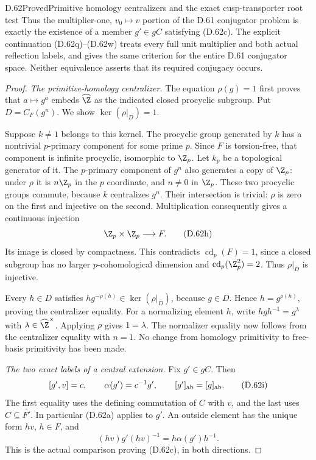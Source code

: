 \begin{claim}{D.62}{Proved}{Primitive homology centralizers and the exact cusp-transporter root test}
Thus the multiplier-one, $v_0\mapsto v$ portion of the
D.61 conjugator problem is exactly the existence of
a member $g'\in gC$ satisfying (D.62c).
The explicit continuation (D.62q)--(D.62w) treats every
full unit multiplier and both actual reflection labels,
and gives the same criterion for the entire D.61
conjugator space. Neither equivalence asserts that
its required conjugacy occurs.
\end{claim}

\begin{proof}
\emph{The primitive-homology centralizer.}
The equation $\rho(g)=1$ first proves that
$a\mapsto g^a$ embeds $\widehat\Z$ as the indicated
closed procyclic subgroup. Put $D=C_F(g^n)$.
We show $\ker(\rho|_D)=1$.

Suppose $k\ne1$ belongs to this kernel.
The procyclic group generated by $k$ has a nontrivial
$p$-primary component for some prime $p$.
Since $F$ is torsion-free, that component is infinite
procyclic, isomorphic to $\Z_p$.
Let $k_p$ be a topological generator of it.
The $p$-primary component of $g^n$ also generates
a copy of $\Z_p$: under $\rho$ it is $n\Z_p$
in the $p$ coordinate, and $n\ne0$ in $\Z_p$.
These two procyclic groups commute, because $k$
centralizes $g^n$. Their intersection is trivial:
$\rho$ is zero on the first and injective on the
second. Multiplication consequently gives a continuous
injection
\[
                 \Z_p\times\Z_p\longrightarrow F.
                                                        \tag{D.62h}
\]
Its image is closed by compactness. This contradicts
$\operatorname{cd}_p(F)=1$, since a closed subgroup
has no larger $p$-cohomological dimension and
$\operatorname{cd}_p(\Z_p^2)=2$.
Thus $\rho|_D$ is injective.

Every $h\in D$ satisfies
$h g^{-\rho(h)}\in\ker(\rho|_D)$, because $g\in D$.
Hence $h=g^{\rho(h)}$, proving the centralizer equality.
For a normalizing element $h$, write
$hgh^{-1}=g^\lambda$ with
$\lambda\in\widehat\Z^\times$.
Applying $\rho$ gives $1=\lambda$.
The normalizer equality now follows from the
centralizer equality with $n=1$.
No change from homology primitivity to free-basis
primitivity has been made.

\emph{The two exact labels of a central extension.}
Fix $g'\in gC$. Then
\[
 [g',v]=c,\qquad
 \alpha(g')=c^{-1}g',\qquad
 [g']_{\rm ab}=[g]_{\rm ab}.
                                                        \tag{D.62i}
\]
The first equality uses the defining commutation of
$C$ with $v$, and the last uses $C\subseteq\overline{F'}$.
In particular (D.62a) applies to $g'$.
An outside element has the unique form $hv$, $h\in F$,
and
\[
 (hv)g'(hv)^{-1}=h\alpha(g')h^{-1}.
                                                        \tag{D.62j}
\]
This is the actual comparison proving (D.62c), in
both directions.


\end{proof}
